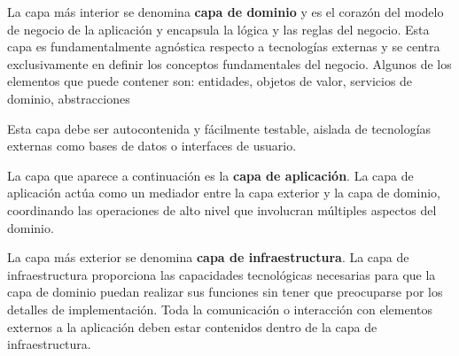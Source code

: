 La capa más interior se denomina \textbf{capa de dominio} y es el corazón del modelo de negocio de la aplicación y
encapsula la lógica y las reglas del negocio.
Esta capa es fundamentalmente agnóstica respecto a tecnologías externas y se centra exclusivamente en definir los
conceptos fundamentales del negocio.
Algunos de los elementos que puede contener son: entidades, objetos de valor, servicios de dominio, abstracciones

Esta capa debe ser autocontenida y fácilmente testable, aislada de tecnologías externas como bases de datos o
interfaces de usuario.

La capa que aparece a continuación es la \textbf{capa de aplicación}.
La capa de aplicación actúa como un mediador entre la capa exterior y la capa de dominio, coordinando las operaciones
de alto nivel que involucran múltiples aspectos del dominio.

La capa más exterior se denomina \textbf{capa de infraestructura}.
La capa de infraestructura proporciona las capacidades tecnológicas necesarias para que la capa de dominio puedan
realizar sus funciones sin tener que preocuparse por los detalles de implementación.
Toda la comunicación o interacción con elementos externos a la aplicación deben estar contenidos dentro de la capa de
infraestructura.
